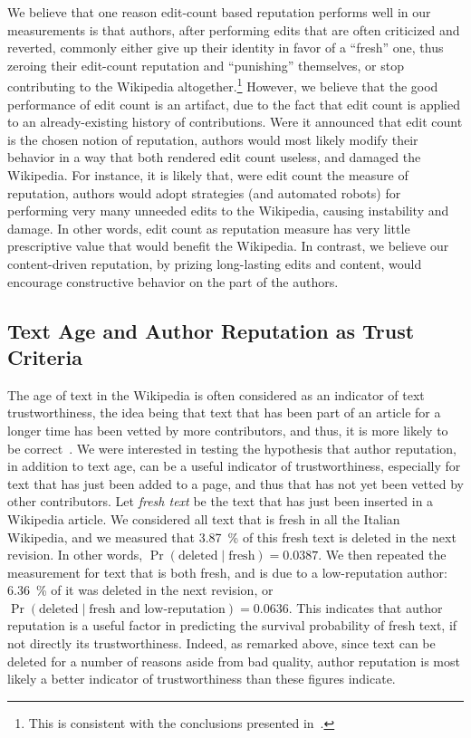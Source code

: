 We believe that one reason edit-count based reputation performs well
in our measurements is that authors, after performing edits that are
often criticized and reverted, commonly either give up their identity
in favor of a ``fresh'' one, thus zeroing their edit-count reputation
and ``punishing'' themselves, or stop contributing to the Wikipedia
altogether.\footnote{This is consistent with the conclusions presented
in~\cite{Halfaker2011}.}
However, we believe that the good performance of edit count is an
artifact, due to the fact that edit count is applied to an
already-existing history of contributions.
Were it announced that edit count is the chosen notion of reputation,
authors would most likely modify their behavior in a way that both
rendered edit count useless, and damaged the Wikipedia.
For instance, it is likely that, were edit count the measure of
reputation, authors would adopt strategies (and automated robots) for
performing very many unneeded edits to the Wikipedia, causing
instability and damage.
In other words, edit count as reputation measure has very little
prescriptive value that would benefit the Wikipedia.
In contrast, we believe our content-driven reputation, by prizing
long-lasting edits and content, would encourage constructive behavior
on the part of the authors.

\subsection{Text Age and Author Reputation as Trust Criteria}

The age of text in the Wikipedia is often considered as an
indicator of text trustworthiness, the idea being that text that has
been part of an article for a longer time has been vetted by more
contributors, and thus, it is more likely to be correct~\cite{Cross2006}.
We were interested in testing the hypothesis that author reputation,
in addition to text age, can be a useful indicator of
trustworthiness, especially for text that has just been added to a
page, and thus that has not yet been vetted by other contributors.
Let {\em fresh text\/} be the text that has just been inserted in a
Wikipedia article.
We considered all text that is fresh in all the Italian
Wikipedia, and we measured that 3.87~\% of this fresh text is deleted
in the next revision.  In other words,
$\Pr(\mbox{deleted}\mid\mbox{fresh}) = 0.0387$.
We then repeated the measurement for text that is both fresh, and is
due to a low-reputation author: 6.36~\% of it was deleted in the next
revision, or
$\Pr(\mbox{deleted}\mid\mbox{fresh and low-reputation}) = 0.0636$.
This indicates that author reputation is a useful factor in predicting
the survival probability of fresh text, if not directly its
trustworthiness.
Indeed, as remarked above, since text can be deleted for a number of
reasons aside from bad quality, author reputation is most likely a
better indicator of trustworthiness than these figures indicate.



